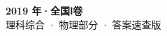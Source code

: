 \documentclass[zihao=-4, a4paper]{ctexart}
\begin{document}
\begin{center}
  {\Large\bfseries 2019 年·全国Ⅰ卷}\\[4pt]
  {\large 理科综合 · 物理部分 · 答案速查版}
\end{center}
\medskip
{}

\clearpage
{}

\end{document}
